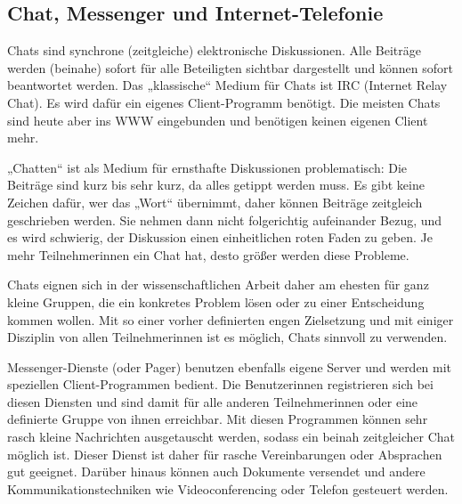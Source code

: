 \documentclass[]{book}
\theoremstyle{definition}
\theoremstyle{definition}
\theoremstyle{definition}
\theoremstyle{remark}
\begin{document}
\subsection{Chat, Messenger und
Internet-Telefonie}\label{chat-messenger-und-internet-telefonie}

Chats sind synchrone (zeitgleiche) elektronische Diskussionen. Alle
Beiträge werden (beinahe) sofort für alle Beteiligten sichtbar
dargestellt und können sofort beantwortet werden. Das „klassische``
Medium für Chats ist IRC (Internet Relay Chat). Es wird dafür ein
eigenes Client-Programm benötigt. Die meisten Chats sind heute aber ins
WWW eingebunden und benötigen keinen eigenen Client mehr.

„Chatten`` ist als Medium für ernsthafte Diskussionen problematisch: Die
Beiträge sind kurz bis sehr kurz, da alles getippt werden muss. Es gibt
keine Zeichen dafür, wer das „Wort`` übernimmt, daher können Beiträge
zeitgleich geschrieben werden. Sie nehmen dann nicht folgerichtig
aufeinander Bezug, und es wird schwierig, der Diskussion einen
einheitlichen roten Faden zu geben. Je mehr Teilnehmerinnen ein Chat
hat, desto größer werden diese Probleme.

Chats eignen sich in der wissenschaftlichen Arbeit daher am ehesten für
ganz kleine Gruppen, die ein konkretes Problem lösen oder zu einer
Entscheidung kommen wollen. Mit so einer vorher definierten engen
Zielsetzung und mit einiger Disziplin von allen Teilnehmerinnen ist es
möglich, Chats sinnvoll zu verwenden.

Messenger-Dienste (oder Pager) benutzen ebenfalls eigene Server und
werden mit speziellen Client-Programmen bedient. Die Benutzerinnen
registrieren sich bei diesen Diensten und sind damit für alle anderen
Teilnehmerinnen oder eine definierte Gruppe von ihnen erreichbar. Mit
diesen Programmen können sehr rasch kleine Nachrichten ausgetauscht
werden, sodass ein beinah zeitgleicher Chat möglich ist. Dieser Dienst
ist daher für rasche Vereinbarungen oder Absprachen gut geeignet.
Darüber hinaus können auch Dokumente versendet und andere
Kommunikationstechniken wie Videoconferencing oder Telefon gesteuert
werden.
\end{document}
